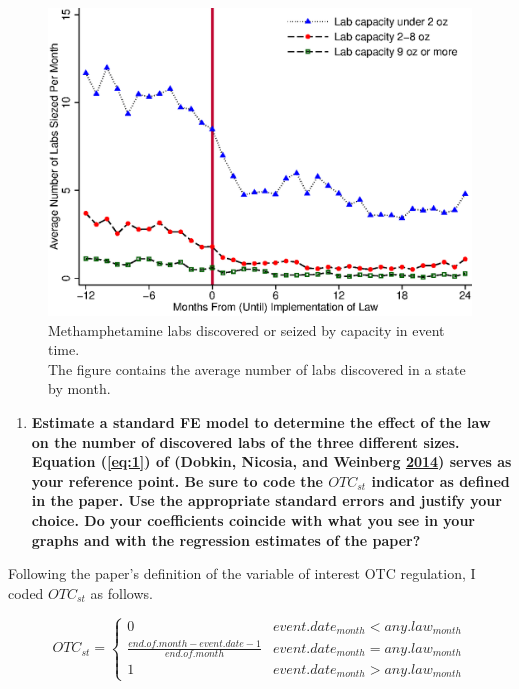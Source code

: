 \documentclass[
  11pt,
]{article}
\providecommand{\tightlist}{%
  \setlength{\itemsep}{0pt}\setlength{\parskip}{0pt}}
\begin{document}
\begin{figure}[hbt!]
 \centering
 \includegraphics{month_from_until_otc-vs-lab_size.eps}
 \caption{Methamphetamine labs discovered or seized by capacity in event time.\\ The figure contains the average number of labs discovered in a state by month.}
\label{fig-2}
\end{figure}

\begin{enumerate}
\def\labelenumi{(\alph{enumi})}
\setcounter{enumi}{2}
\tightlist
\item
  \textbf{Estimate a standard FE model to determine the effect of the
  law on the number of discovered labs of the three different sizes.
  Equation (\ref{eq:1}) of (Dobkin, Nicosia, and Weinberg
  \protect\hyperlink{ref-DOBKIN201448}{2014}) serves as your reference
  point. Be sure to code the \(OTC_{st}\) indicator as defined in the
  paper. Use the appropriate standard errors and justify your choice. Do
  your coefficients coincide with what you see in your graphs and with
  the regression estimates of the paper?}
\end{enumerate}

Following the paper's definition of the variable of interest OTC
regulation, I coded \(OTC_{st}\) as follows.

\[OTC_{st} = \begin{cases} 
      0 & event.date_{month} < any.law_{month} \\
      \frac{end.of.month-event.date-1}{end.of.month} & event.date_{month} = any.law_{month} \\
      1 & event.date_{month} > any.law_{month}
   \end{cases}\]
\end{document}
